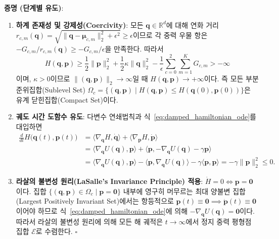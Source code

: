 \documentclass[11pt,a4paper]{article}
\begin{document}
\textbf{증명 (단계별 유도)}:
\begin{enumerate}[leftmargin=18pt, itemsep=2pt]
  \item \textbf{하계 존재성 및 강제성(Coercivity)}: 모든 $\mathbf{q} \in \mathbb{R}^d$에 대해 연화 거리 $r_{c,m}(\mathbf{q}) = \sqrt{\|\mathbf{q}-\boldsymbol{\mu}_{c,m}\|_2^2 + \epsilon^2} \ge \epsilon$이므로 각 중력 우물 항은 $-G_{c,m} / r_{c,m}(\mathbf{q}) \ge -G_{c,m}/\epsilon$을 만족한다. 따라서
  \begin{equation}
    H(\mathbf{q}, \mathbf{p}) \ge \frac{1}{2}\|\mathbf{p}\|_2^2 + \frac{1}{2}\kappa \|\mathbf{q}\|_2^2 - \frac{1}{\epsilon}\sum_{c=0}^{2}\sum_{m=1}^{K} G_{c,m} > -\infty
  \end{equation}
  이며, $\kappa > 0$이므로 $\|(\mathbf{q}, \mathbf{p})\|_2 \to \infty$일 때 $H(\mathbf{q}, \mathbf{p}) \to +\infty$이다. 즉 모든 부분준위집합(Sublevel Set) $\Omega_c = \{(\mathbf{q}, \mathbf{p}) \mid H(\mathbf{q}, \mathbf{p}) \le H(\mathbf{q}(0), \mathbf{p}(0))\}$은 유계 닫힌집합(Compact Set)이다.
  \item \textbf{궤도 시간 도함수 유도}: 다변수 연쇄법칙과 식~\eqref{eq:damped_hamiltonian_ode}를 대입하면
  \begin{align}
    \frac{d}{dt}H\big(\mathbf{q}(t), \mathbf{p}(t)\big)
    &= \big\langle \nabla_{\mathbf{q}} H, \dot{\mathbf{q}} \big\rangle + \big\langle \nabla_{\mathbf{p}} H, \dot{\mathbf{p}} \big\rangle \nonumber \\
    &= \big\langle \nabla_{\mathbf{q}} U(\mathbf{q}), \mathbf{p} \big\rangle + \big\langle \mathbf{p}, -\nabla_{\mathbf{q}} U(\mathbf{q}) - \gamma \mathbf{p} \big\rangle \nonumber \\
    &= \big\langle \nabla_{\mathbf{q}} U(\mathbf{q}), \mathbf{p} \big\rangle - \big\langle \mathbf{p}, \nabla_{\mathbf{q}} U(\mathbf{q}) \big\rangle - \gamma \langle \mathbf{p}, \mathbf{p} \rangle
     = -\gamma \|\mathbf{p}\|_2^2 \le 0.
    \label{eq:lyapunov_dissipation}
  \end{align}
  \item \textbf{라살의 불변성 원리(LaSalle's Invariance Principle) 적용}: $\dot{H} = 0 \iff \mathbf{p} = \mathbf{0}$이다. 집합 $\{(\mathbf{q}, \mathbf{p}) \in \Omega_c \mid \mathbf{p} = \mathbf{0}\}$ 내부에 영구히 머무르는 최대 양불변 집합(Largest Positively Invariant Set)에서는 항등적으로 $\mathbf{p}(t) \equiv \mathbf{0} \implies \dot{\mathbf{p}}(t) \equiv \mathbf{0}$이어야 하므로 식~\eqref{eq:damped_hamiltonian_ode}에 의해 $-\nabla_{\mathbf{q}} U(\mathbf{q}) = \mathbf{0}$이다. 따라서 라살의 불변성 원리에 의해 모든 해 궤적은 $t \to \infty$에서 정지 중력 평형점 집합 $\mathcal{E}$로 수렴한다. \hfill $\square$
\end{enumerate}
\end{document}

